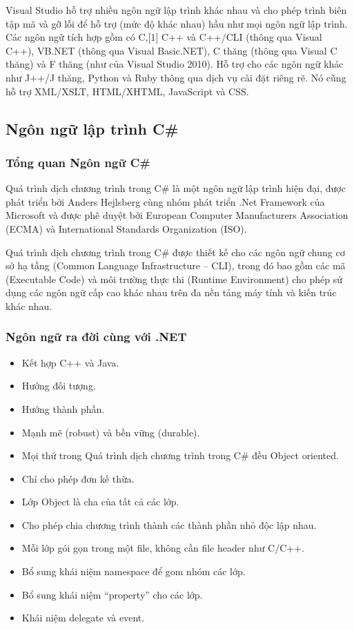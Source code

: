Visual Studio hỗ trợ nhiều ngôn ngữ lập trình khác nhau và cho phép trình biên tập mã và gỡ lỗi để hỗ trợ (mức độ khác nhau) hầu như mọi ngôn ngữ lập trình. Các ngôn ngữ tích hợp gồm có C,[1] C++ và C++/CLI (thông qua Visual C++), VB.NET (thông qua Visual Basic.NET), C thăng (thông qua Visual C thăng) và F thăng (như của Visual Studio 2010). Hỗ trợ cho các ngôn ngữ khác như J++/J thăng, Python và Ruby thông qua dịch vụ cài đặt riêng rẽ. Nó cũng hỗ trợ XML/XSLT, HTML/XHTML, JavaScript và CSS.

\subsection*{Ngôn ngữ lập trình C\# }
\subsubsection*{Tổng quan Ngôn ngữ C\# }
Quá trình dịch chương trình trong C\# là một ngôn ngữ lập trình hiện đại, được phát triển bởi Anders Hejlsberg cùng nhóm phát triển .Net Framework của Microsoft và được phê duyệt bởi European Computer Manufacturers Association (ECMA) và International Standards Organization (ISO).

Quá trình dịch chương trình trong C\#  được thiết kế cho các ngôn ngữ chung cơ sở hạ tầng (Common Language Infrastructure – CLI), trong đó bao gồm các mã (Executable Code) và môi trường thực thi (Runtime Environment) cho phép sử dụng các ngôn ngữ cấp cao khác nhau trên đa nền tảng máy tính và kiến trúc khác nhau.

\subsubsection*{Ngôn ngữ ra đời cùng với .NET}
\begin{itemize}
	\item Kết hợp C++ và Java.
	\item Hướng đối tượng.
	\item Hướng thành phần.
	\item Mạnh mẽ (robust) và bền vững (durable).
	\item Mọi thứ trong Quá trình dịch chương trình trong C\#  đều Object oriented.
	\item Chỉ cho phép đơn kế thừa.
	\item Lớp Object là cha của tất cả các lớp.
	\item Cho phép chia chương trình thành các thành phần nhỏ độc lập nhau.
	\item Mỗi lớp gói gọn trong một file, không cần file header như C/C++.
	\item Bổ sung khái niệm namespace để gom nhóm các lớp.
	\item Bổ sung khái niệm “property” cho các lớp.
	\item Khái niệm delegate và event.
\end{itemize}

